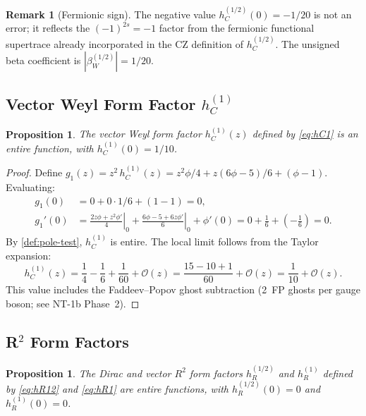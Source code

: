 \documentclass[11pt,a4paper]{article}
\theoremstyle{plain}
\newtheorem{proposition}[theorem]{Proposition}
\theoremstyle{definition}
\newtheorem{remark}[theorem]{Remark}
\begin{document}
\begin{remark}[Fermionic sign]\label{rem:fermionic-sign}
The negative value $h_C^{(1/2)}(0) = -1/20$ is not an error; it
reflects the $(-1)^{2s} = -1$ factor from the fermionic functional
supertrace already incorporated in the CZ definition of $h_C^{(1/2)}$.
The unsigned beta coefficient is $|\beta_W^{(1/2)}| = 1/20$.
\end{remark}

\subsection{Vector Weyl Form Factor $h_C^{(1)}$}

\begin{proposition}\label{prop:hC1-entire}
The vector Weyl form factor $h_C^{(1)}(z)$ defined by \cref{eq:hC1}
is an entire function, with $h_C^{(1)}(0) = 1/10$.
\end{proposition}

\begin{proof}
Define $g_1(z) = z^2\, h_C^{(1)}(z)
= z^2\phi/4 + z(6\phi-5)/6 + (\phi-1)$.
Evaluating:
\begin{align}
  g_1(0) &= 0 + 0 \cdot 1/6 + (1-1) = 0,\\
  g_1'(0) &= \left.\frac{2z\phi + z^2\phi'}{4}\right|_0
    + \left.\frac{6\phi - 5 + 6z\phi'}{6}\right|_0 + \phi'(0)
    = 0 + \frac{1}{6} + \left(-\frac{1}{6}\right) = 0.
\end{align}
By \cref{def:pole-test}, $h_C^{(1)}$ is entire.
The local limit follows from the Taylor expansion:
\begin{equation}
  h_C^{(1)}(z) = \frac{1}{4} - \frac{1}{6} + \frac{1}{60}
  + \mathcal{O}(z) = \frac{15 - 10 + 1}{60} + \mathcal{O}(z)
  = \frac{1}{10} + \mathcal{O}(z).
\end{equation}
This value includes the Faddeev--Popov ghost subtraction
(2~FP ghosts per gauge boson; see NT-1b Phase~2).
\end{proof}

\subsection{R$^2$ Form Factors}

\begin{proposition}\label{prop:hR-entire}
The Dirac and vector $R^2$ form factors $h_R^{(1/2)}$ and $h_R^{(1)}$
defined by \cref{eq:hR12} and \cref{eq:hR1} are entire functions, with
$h_R^{(1/2)}(0) = 0$ and $h_R^{(1)}(0) = 0$.
\end{proposition}
\end{document}
